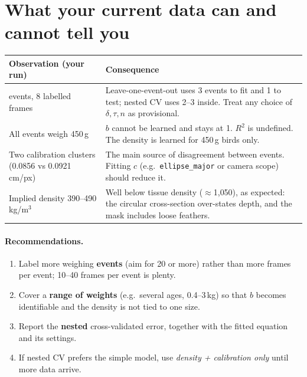 \documentclass[11pt,a4paper]{article}
\begin{document}
\section{What your current data can and cannot tell you}
\begin{tabular}{@{}>{\raggedright\arraybackslash}p{4.6cm}>{\raggedright\arraybackslash}p{10.4cm}@{}}
\toprule
\textbf{Observation (your run)} & \textbf{Consequence}\\
\midrule
4 events, 8 labelled frames & Leave-one-event-out uses 3 events to fit and 1 to test; nested CV uses 2--3 inside. Treat any choice of $\delta,\tau,n$ as provisional.\\
All events weigh 450\,g & $b$ cannot be learned and stays at 1. $R^2$ is undefined. The density is learned for 450\,g birds only.\\
Two calibration clusters (0.0856 vs 0.0921 cm/px) & The main source of disagreement between events. Fitting $c$ (e.g.\ \texttt{ellipse\_major} or camera scope) should reduce it.\\
Implied density 390--490 kg/m$^3$ & Well below tissue density ($\approx$1{,}050), as expected: the circular cross-section over-states depth, and the mask includes loose feathers.\\
\bottomrule
\end{tabular}

\paragraph{Recommendations.}
\begin{enumerate}[nosep]
  \item Label more weighing \textbf{events} (aim for 20 or more) rather than more frames per event; 10--40 frames per event is plenty.
  \item Cover a \textbf{range of weights} (e.g.\ several ages, 0.4--3\,kg) so that $b$ becomes identifiable and the density is not tied to one size.
  \item Report the \textbf{nested} cross-validated error, together with the fitted equation and its settings.
  \item If nested CV prefers the simple model, use \emph{density + calibration only} until more data arrive.
\end{enumerate}

\appendix
\end{document}
